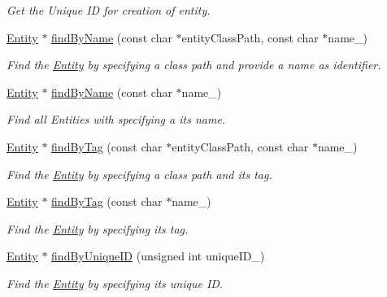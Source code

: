 \begin{DoxyCompactItemize}
\begin{DoxyCompactList}\small\item\em Get the Unique ID for creation of entity. \end{DoxyCompactList}\item 
\hyperlink{class_i_dream_sky_1_1_entity}{Entity} $\ast$ \hyperlink{class_i_dream_sky_1_1_entity_1_1_factory_a4fa2251befd88022de0971ba69566185}{find\+By\+Name} (const char $\ast$entity\+Class\+Path, const char $\ast$name\+\_\+)
\begin{DoxyCompactList}\small\item\em Find the \hyperlink{class_i_dream_sky_1_1_entity}{Entity} by specifying a class path and provide a name as identifier. \end{DoxyCompactList}\item 
\hyperlink{class_i_dream_sky_1_1_entity}{Entity} $\ast$ \hyperlink{class_i_dream_sky_1_1_entity_1_1_factory_a7b67defc2c3bd986ac0a56687c2ab934}{find\+By\+Name} (const char $\ast$name\+\_\+)
\begin{DoxyCompactList}\small\item\em Find all Entities with specifying a its name. \end{DoxyCompactList}\item 
\hyperlink{class_i_dream_sky_1_1_entity}{Entity} $\ast$ \hyperlink{class_i_dream_sky_1_1_entity_1_1_factory_a473713fa8f8d064bf8daa9be8b8fd7d3}{find\+By\+Tag} (const char $\ast$entity\+Class\+Path, const char $\ast$name\+\_\+)
\begin{DoxyCompactList}\small\item\em Find the \hyperlink{class_i_dream_sky_1_1_entity}{Entity} by specifying a class path and its tag. \end{DoxyCompactList}\item 
\hyperlink{class_i_dream_sky_1_1_entity}{Entity} $\ast$ \hyperlink{class_i_dream_sky_1_1_entity_1_1_factory_a9ed9e26f3be561cb1dc76db0333f7da2}{find\+By\+Tag} (const char $\ast$name\+\_\+)
\begin{DoxyCompactList}\small\item\em Find the \hyperlink{class_i_dream_sky_1_1_entity}{Entity} by specifying its tag. \end{DoxyCompactList}\item 
\hyperlink{class_i_dream_sky_1_1_entity}{Entity} $\ast$ \hyperlink{class_i_dream_sky_1_1_entity_1_1_factory_a0c4f0fb313889ee5537054d65b0bcdfb}{find\+By\+Unique\+ID} (unsigned int unique\+I\+D\+\_\+)
\begin{DoxyCompactList}\small\item\em Find the \hyperlink{class_i_dream_sky_1_1_entity}{Entity} by specifying its unique ID. \end{DoxyCompactList}\item 

\end{DoxyCompactItemize}
